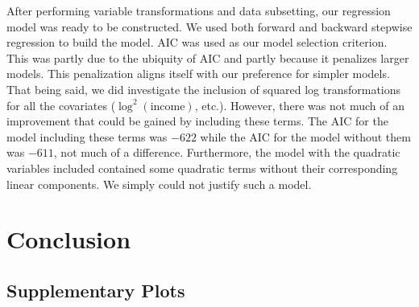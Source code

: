 \documentclass{article}\usepackage[]{graphicx}\usepackage[]{color}
\begin{document}
After performing variable transformations and data subsetting, our regression model was ready to be constructed. We used both forward and backward stepwise regression to build the model. AIC was used as our model selection criterion. This was partly due to the ubiquity of AIC and partly because it penalizes larger models. This penalization aligns itself with our preference for simpler models. That being said, we did investigate the inclusion of squared log transformations for all the covariates ($\log^2(\text{income})$, etc.). However, there was not much of an improvement that could be gained by including these terms. The AIC for the model including these terms was $-622$ while the AIC for the model without them was $-611$, not much of a difference. Furthermore, the model with the quadratic variables included contained some quadratic terms without their corresponding linear components. We simply could not justify such a model.

\section{Conclusion} \label{conclusion}



\newpage
\begin{appendices}

\section{Supplementary Plots} \label{appendix_plots}

\end{appendices}
\end{document}
